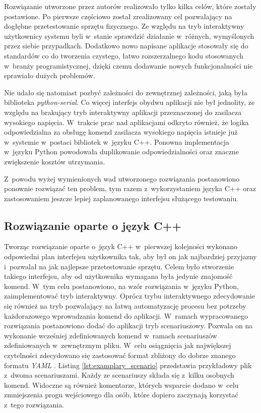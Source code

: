 Rozwiązanie utworzone przez autorów realizowało tylko kilka celów, które zostały postawione. Po pierwsze częściowo został zrealizowany cel pozwalający na dogłębne przetestowanie sprzętu fizycznego. Ze względu na tryb interaktywny użytkownicy systemu byli w~stanie sprawdzić działanie w~różnych, wymyślonych przez siebie przypadkach. Dodatkowo nowo napisane aplikacje stosowały się do standardów co do tworzenia czystego, łatwo rozszerzalnego kodu stosowanych w~branży programistycznej, dzięki czemu dodawanie nowych funkcjonalności nie sprawiało dużych problemów.

Nie udało się natomiast pozbyć zależności do zewnętrznej zależności, jaką była biblioteka \emph{python-serial}. Co więcej interfejs obydwu aplikacji nie był jednolity, ze względu na brakujący tryb interaktywny aplikacji przeznaczonej do zasilacza wysokiego napięcia. W~trakcie prac nad aplikacjami odkryto również, że logika odpowiedzialna za obsługę komend zasilacza wysokiego napięcia istnieje już w~systemie w~postaci bibliotek w~języku C++. Ponowna implementacja w~języku Python powodowała duplikowanie odpowiedzialności oraz znaczne zwiększenie kosztów utrzymania.

Z~powodu wyżej wymienionych wad utworzonego rozwiązania postanowiono ponownie rozwiązać ten problem, tym razem z~wykorzystaniem języka C++ oraz zastosowaniem jeszcze lepiej zaplanowanego interfejsu służącego testowaniu.

\subsection{Rozwiązanie oparte o język C++}
Tworząc rozwiązanie oparte o~język C++ w~pierwszej kolejności wykonano odpowiedni plan interfejsu użytkownika tak, aby był on jak najbardziej przyjazny i~pozwalał na jak najlepsze przetestowanie sprzętu. Celem było stworzenie takiego interfejsu, aby od użytkownika wymagana była jedynie znajomość komend. W~tym celu postanowiono, na wzór rozwiązania w~języku Python, zaimplementować tryb interaktywny. Oprócz trybu interaktywnego zdecydowanie się również na tryb pozwalający na łatwą automatyzację procesu bez potrzeby każdorazowego wprowadzania komend do aplikacji. W~ramach wypracowanego rozwiązania postanowiono dodać do aplikacji tryb scenariuszowy. Pozwala on na wykonanie wcześniej zdefiniowanych komend w~ramach scenariuszów zdefiniowanych w~zewnętrznym pliku. W~celu osiągnięcia jak największej czytelności zdecydowano się zastosować format zbliżony do dobrze znanego formatu \emph{YAML} \cite{yaml}. Listing \ref{lst:examplary_scenario} przedstawia przykładowy plik z~dwoma scenariuszami. Każdy ze scenariuszy składa się z~kilku osobnych komend. Widoczne są również komentarze, których wsparcie dodano w~celu zmniejszenia progu wejściowego dla osób, które dopiero zaczynają korzystać z~tego rozwiązania.

